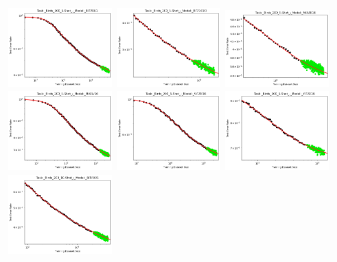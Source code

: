 \documentclass{article} %
\begin{document}
\begin{figure}[!htb]
    \centering

\includegraphics[width=0.245\textwidth]{figures/scaling_laws_benchmark_dataset_plots/birds_5___BiT_50_1.png}
\includegraphics[width=0.245\textwidth]{figures/scaling_laws_benchmark_dataset_plots/birds_5___BiT_101_3.png}
\includegraphics[width=0.245\textwidth]{figures/scaling_laws_benchmark_dataset_plots/birds_5___MiX_B_16.png}
\includegraphics[width=0.245\textwidth]{figures/scaling_laws_benchmark_dataset_plots/birds_5___MiX_L_16.png}
\includegraphics[width=0.245\textwidth]{figures/scaling_laws_benchmark_dataset_plots/birds_5___ViT_B_16.png}
\includegraphics[width=0.245\textwidth]{figures/scaling_laws_benchmark_dataset_plots/birds_5___ViT_S_16.png}
\includegraphics[width=0.245\textwidth]{figures/scaling_laws_benchmark_dataset_plots/birds_10___BiT_50_1.png}

\end{figure}
\end{document}
